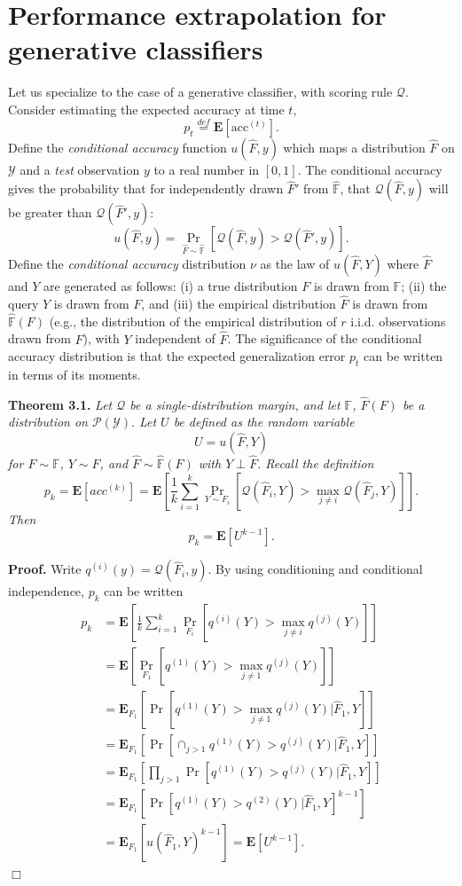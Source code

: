 \documentclass{article}
\newcommand{\E}{\textbf{E}}
\begin{document}
\section{Performance extrapolation for generative classifiers}

Let us specialize to the case of a generative classifier, with scoring rule $\mathcal{Q}$.
Consider estimating the expected accuracy at time $t$, \[p_t
\stackrel{def}{=} \E[\text{acc}^{(t)}].\]
Define the \emph{conditional accuracy} function $u(\hat{F}, y)$ which maps a
distribution $\hat{F}$ on $\mathcal{Y}$ and a \emph{test} observation $y$ to
a real number in $[0,1]$.  The conditional accuracy gives the
probability that for independently drawn $\hat{F}'$ from $\hat{\mathbb{F}}$, that
$\mathcal{Q}(\hat{F}, y)$ will be greater than $\mathcal{Q}(\hat{F}', y)$:
\[
u(\hat{F}, y) = \Pr_{\hat{F} \sim \hat{\mathbb{F}}}[\mathcal{Q}(\hat{F}, y) > \mathcal{Q}(\hat{F}', y)].
\]
Define the \emph{conditional accuracy} distribution $\nu$ as the law
of $u(\hat{F}, Y)$ where $\hat{F}$ and $Y$ are generated as follows:
(i) a true distribution $F$ is drawn from $\mathbb{F}$; (ii) the query $Y$ is drawn from $F$, 
and (iii) the empirical distribution $\hat{F}$ is drawn from $\hat{\mathbb{F}}(F)$ 
(e.g., the distribution of the empirical distribution of $r$ i.i.d. observations drawn from $F$),
with $Y$ independent of $\hat{F}$.  The significance of the conditional accuracy
distribution is that the expected generalization error $p_t$ can be
written in terms of its moments.

\noindent\textbf{Theorem 3.1.} \emph{
Let $\mathcal{Q}$ be a single-distribution margin, and let $\mathbb{F}$, $\hat{F}(F)$ be a distribution on $\mathcal{P}(\mathcal{Y}).$
Let $U$ be defined as the random variable
\[
U = u(\hat{F}, Y)
\]
for $F \sim \mathbb{F}$, $Y \sim F$, and $\hat{F} \sim \hat{\mathbb{F}}(F)$ with $Y \perp \hat{F}$.
Recall the definition
\[
p_k = \E[acc^{(k)}] = \E\left[\frac{1}{k}\sum_{i=1}^k \Pr_{Y \sim F_i}[\mathcal{Q}(\hat{F}_i, Y) > \max_{j \neq i}\mathcal{Q}(\hat{F}_j, Y)]\right].
\]
Then \[p_k = \E[U^{k-1}].\]
}

\noindent\textbf{Proof.}  
Write $q^{(i)}(y) = \mathcal{Q}(\hat{F}_i, y)$.
By using conditioning and
conditional independence, $p_k$ can be written
\begin{align*}
p_k &= \E\left[ \frac{1}{k}\sum_{i=1}^k  \Pr_{F_i}[q^{(i)}(Y) > \max_{j\neq i} q^{(j)}(Y)] \right]
\\&= \E\left[ \Pr_{F_1}[q^{(1)}(Y) > \max_{j\neq 1} q^{(j)}(Y)] \right]
\\&= \E_{F_1}[\Pr[q^{(1)}(Y) > \max_{j\neq 1} q^{(j)}(Y)|\hat{F}_1, Y]]
\\&= \E_{F_1}[\Pr[\cap_{j > 1} q^{(1)}(Y) > q^{(j)}(Y)|\hat{F}_1, Y]]
\\&= \E_{F_1}[\prod_{j > 1}\Pr[q^{(1)}(Y) > q^{(j)}(Y)|\hat{F}_1, Y]]
\\&= \E_{F_1}[\Pr[q^{(1)}(Y) > q^{(2)}(Y)|\hat{F}_1, Y]^{k-1}]
\\&= \E_{F_1}[u(\hat{F}_1, Y)^{k-1}] = \E[U^{k-1}].
\end{align*}
$\Box$
\end{document}
